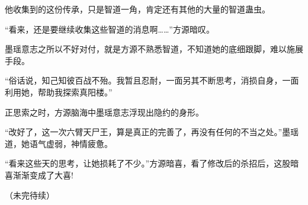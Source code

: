 \begin{this_body}
他收集到的这份传承，只是智道一角，肯定还有其他的大量的智道蛊虫。

“看来，还是要继续收集这些智道的消息啊……”方源暗叹。

墨瑶意志之所以不好对付，就是方源不熟悉智道，不知道她的底细跟脚，难以施展手段。

“俗话说，知己知彼百战不殆。我暂且忍耐，一面另其不断思考，消损自身，一面利用她，帮助我探索真阳楼。”

正思索之时，方源脑海中墨瑶意志浮现出隐约的身形。

“改好了，这一次六臂天尸王，算是真正的完善了，再没有任何的不当之处。”墨瑶道，她语气虚弱，神情疲惫。

“看来这些天的思考，让她损耗了不少。”方源暗喜，看了修改后的杀招后，这股暗喜渐渐变成了大喜!

（未完待续）

\end{this_body}

